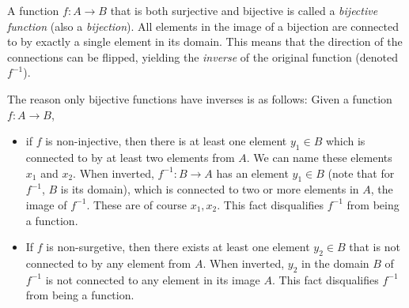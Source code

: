 A function $f:A\to B$ that is both surjective and bijective is called a \emph{bijective function} (also a \emph{bijection}). All elements in the image of a bijection are connected to by exactly a single element in its domain. This means that the direction of the connections can be flipped, yielding the \emph{inverse} of the original function (denoted $f^{-1}$).

The reason only bijective functions have inverses is as follows: Given a function $f:A\to B$,
\begin{itemize}
	\item if $f$ is non-injective, then there is at least one element $y_{1}\in B$ which is connected to by at least two elements from $A$. We can name these elements $x_{1}$ and $x_{2}$. When inverted, $f^{-1}:B\to A$ has an element $y_{1}\in B$ (note that for $f^{-1}$, $B$ is its domain), which is connected to two or more elements in $A$, the image of $f^{-1}$. These are of course $x_{1},x_{2}$. This fact disqualifies $f^{-1}$ from being a function.
	\item If $f$ is non-surgetive, then there exists at least one element $y_{2}\in B$ that is not connected to by any element from $A$. When inverted, $y_{2}$ in the domain $B$ of $f^{-1}$ is not connected to any element in its image $A$. This fact disqualifies $f^{-1}$ from being a function.
\end{itemize}

\blindtext


